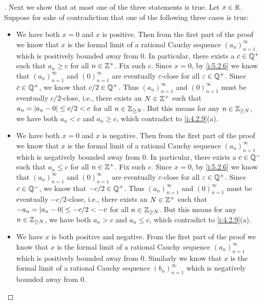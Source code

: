 \begin{proof}[]
  Next we show that at most one of the three statements is true.
  Let \(x \in \mathbb{R}\).
  Suppose for sake of contradiction that one of the following three cases is true:
  \begin{itemize}
    \item We have both \(x = 0\) and \(x\) is positive.
          Then from the first part of the proof we know that \(x\) is the formal limit of a rational Cauchy sequence \((a_n)_{n = 1}^\infty\) which is positively bounded away from \(0\).
          In particular, there exists a \(c \in \mathbb{Q}^+\) such that \(a_n \geq c\) for all \(n \in \mathbb{Z}^+\).
          Fix such \(c\).
          Since \(x = 0\), by \cref{i:5.2.6} we know that \((a_n)_{n = 1}^\infty\) and \((0)_{n = 1}^\infty\) are eventually \(\varepsilon\)-close for all \(\varepsilon \in \mathbb{Q}^+\).
          Since \(c \in \mathbb{Q}^+\), we know that \(c / 2 \in \mathbb{Q}^+\).
          Thus \((a_n)_{n = 1}^\infty\) and \((0)_{n = 1}^\infty\) must be eventually \(c / 2\)-close, i.e., there exists an \(N \in \mathbb{Z}^+\) such that \(a_n = \left\lvert a_n - 0\right\rvert \leq c / 2 < c\) for all \(n \in \mathbb{Z}_{\geq N}\).
          But this means for any \(n \in \mathbb{Z}_{\geq N}\), we have both \(a_n < c\) and \(a_n \geq c\), which contradict to \cref{i:4.2.9}(a).
    \item We have both \(x = 0\) and \(x\) is negative.
          Then from the first part of the proof we know that \(x\) is the formal limit of a rational Cauchy sequence \((a_n)_{n = 1}^\infty\) which is negatively bounded away from \(0\).
          In particular, there exists a \(c \in \mathbb{Q}^-\) such that \(a_n \leq c\) for all \(n \in \mathbb{Z}^+\).
          Fix such \(c\).
          Since \(x = 0\), by \cref{i:5.2.6} we know that \((a_n)_{n = 1}^\infty\) and \((0)_{n = 1}^\infty\) are eventually \(\varepsilon\)-close for all \(\varepsilon \in \mathbb{Q}^+\).
          Since \(c \in \mathbb{Q}^-\), we know that \(-c / 2 \in \mathbb{Q}^+\).
          Thus \((a_n)_{n = 1}^\infty\) and \((0)_{n = 1}^\infty\) must be eventually \(-c / 2\)-close, i.e., there exists an \(N \in \mathbb{Z}^+\) such that \(-a_n = \left\lvert a_n - 0\right\rvert \leq -c / 2 < -c\) for all \(n \in \mathbb{Z}_{\geq N}\).
          But this means for any \(n \in \mathbb{Z}_{\geq N}\), we have both \(a_n > c\) and \(a_n \leq c\), which contradict to \cref{i:4.2.9}(a).
    \item We have \(x\) is both positive and negative.
          From the first part of the proof we know that \(x\) is the formal limit of a rational Cauchy sequence \((a_n)_{n = 1}^\infty\) which is positively bounded away from \(0\).
          Similarly we know that \(x\) is the formal limit of a rational Cauchy sequence \((b_n)_{n = 1}^\infty\) which is negatively bounded away from \(0\).

\end{itemize}
\end{proof}
